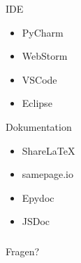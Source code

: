 \documentclass[11pt, usepdftitle=false,...]{beamer}
\begin{document}
	
	
	\begin{frame}{IDE}
	    \begin{itemize}
	        \item PyCharm
	        \item WebStorm
	        \item VSCode
	        \item Eclipse
	    \end{itemize}
	\end{frame}
	
	\begin{frame}{Dokumentation}
	    \begin{itemize}
	        \item ShareLaTeX
	        \item samepage.io
	        \item Epydoc
	        \item JSDoc
	    \end{itemize}
	\end{frame}
	    
	
	\begin{frame}
		\frametitle{}
		\centering
		\Huge Fragen?
	\end{frame}
	
\end{document}
